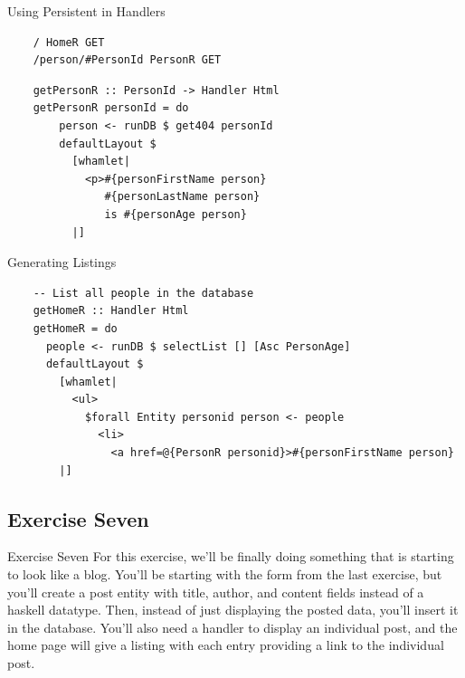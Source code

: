 \documentclass[pdf]{beamer}
\begin{document}
\begin{frame}[fragile]{Using Persistent in Handlers}
  \begin{verbatim}
    / HomeR GET
    /person/#PersonId PersonR GET
  \end{verbatim}
  \begin{verbatim}
    getPersonR :: PersonId -> Handler Html
    getPersonR personId = do
        person <- runDB $ get404 personId
        defaultLayout $
          [whamlet|
            <p>#{personFirstName person}
               #{personLastName person}
               is #{personAge person}
          |]
  \end{verbatim}
\end{frame}

\begin{frame}[fragile]{Generating Listings}
  \begin{verbatim}
    -- List all people in the database
    getHomeR :: Handler Html
    getHomeR = do
      people <- runDB $ selectList [] [Asc PersonAge]
      defaultLayout $
        [whamlet|
          <ul>
            $forall Entity personid person <- people
              <li>
                <a href=@{PersonR personid}>#{personFirstName person}
        |]
  \end{verbatim}
\end{frame}

\subsection{Exercise Seven}
\begin{frame}{Exercise Seven}
  For this exercise, we'll be finally doing something that is starting
  to look like a blog. You'll be starting with the form from the last
  exercise, but you'll create a post entity with title, author, and
  content fields instead of a haskell datatype. Then, instead of just
  displaying the posted data, you'll insert it in the database. You'll
  also need a handler to display an individual post, and the home page
  will give a listing with each entry providing a link to the
  individual post.
\end{frame}
\end{document}
